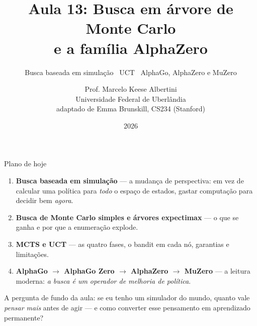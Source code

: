 \documentclass[aspectratio=169, 11pt]{beamer}
\title[Aula 13 — MCTS e AlphaZero]{Aula 13: Busca em árvore de Monte Carlo\\ e a família AlphaZero}
\subtitle[Aprendizagem por Reforço]{Busca baseada em simulação \textbullet\ UCT \textbullet\ AlphaGo, AlphaZero e MuZero}
\author[Prof. Marcelo K. Albertini]{Prof. Marcelo Keese Albertini \\
  \footnotesize Universidade Federal de Uberlândia \\
  \footnotesize adaptado de Emma Brunskill, CS234 (Stanford)}
\institute{Universidade Federal de Uberlândia}
\date{2026}
\begin{document}
\begin{frame}\titlepage\end{frame}

\begin{frame}{Plano de hoje}
  \begin{enumerate}
    \item \textbf{Busca baseada em simulação} — a mudança de perspectiva:
          em vez de calcular uma política para \emph{todo} o espaço de estados,
          gastar computação para decidir bem \emph{agora}.
    \item \textbf{Busca de Monte Carlo simples e árvores expectimax} — o que
          se ganha e por que a enumeração explode.
    \item \textbf{MCTS e UCT} — as quatro fases, o bandit em cada nó,
          garantias e limitações.
    \item \textbf{AlphaGo $\to$ AlphaGo Zero $\to$ AlphaZero $\to$ MuZero} — a
          leitura moderna: \emph{a busca é um operador de melhoria de política}.
  \end{enumerate}

  \vfill
  \begin{ideiabox}
    A pergunta de fundo da aula: se eu tenho um simulador do mundo, quanto
    vale \emph{pensar mais} antes de agir --- e como converter esse
    pensamento em aprendizado permanente?
  \end{ideiabox}
\end{frame}
\end{document}
